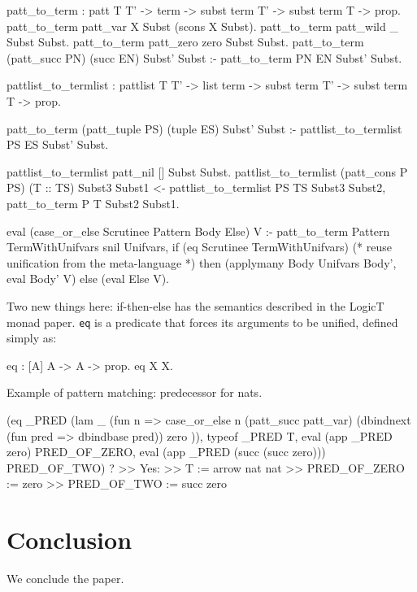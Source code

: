 \documentclass[format=acmlarge,review,anonymous]{acmart}\settopmatter{printfolios=true}
\begin{document}
\begin{codequote}
patt_to_term : patt T T' -> term -> subst term T' -> subst term T -> prop.
patt_to_term patt_var X Subst (scons X Subst).
patt_to_term patt_wild _ Subst Subst.
patt_to_term patt_zero zero Subst Subst.
patt_to_term (patt_succ PN) (succ EN) Subst' Subst :- patt_to_term PN EN Subst' Subst.

pattlist_to_termlist : pattlist T T' -> list term -> subst term T' -> subst term T -> prop.

patt_to_term (patt_tuple PS) (tuple ES) Subst' Subst :-
  pattlist_to_termlist PS ES Subst' Subst.

pattlist_to_termlist patt_nil [] Subst Subst.
pattlist_to_termlist (patt_cons P PS) (T :: TS) Subst3 Subst1 <-
  pattlist_to_termlist PS TS Subst3 Subst2,
  patt_to_term P T Subst2 Subst1.

eval (case_or_else Scrutinee Pattern Body Else) V :-
  patt_to_term Pattern TermWithUnifvars snil Unifvars,
  if (eq Scrutinee TermWithUnifvars)  (* reuse unification from the meta-language *)
  then (applymany Body Unifvars Body', eval Body' V)
  else (eval Else V).
\end{codequote}

Two new things here: if-then-else has the semantics described in the LogicT monad paper. \texttt{eq}
is a predicate that forces its arguments to be unified, defined simply as:

\begin{codequote}
eq : [A] A -> A -> prop.
eq X X.
\end{codequote}

Example of pattern matching: predecessor for nats.

\begin{codequote}
(eq _PRED 
  (lam _ (fun n => 
    case_or_else n
      (patt_succ patt_var) (dbindnext (fun pred => dbindbase pred))
      zero
      )),
 typeof _PRED T,
 eval (app _PRED zero) PRED_OF_ZERO,
 eval (app _PRED (succ (succ zero))) PRED_OF_TWO) ?
>> Yes:
>> T := arrow nat nat
>> PRED_OF_ZERO := zero
>> PRED_OF_TWO := succ zero
\end{codequote}



\section{Conclusion}

\TODO{} We conclude the paper.


\end{document}
